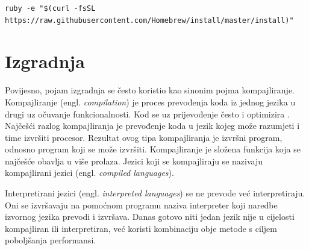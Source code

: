 \documentclass[times, utf8, diplomski, numeric]{fer}
\newcommand{\eng}[1]{(engl. \textit{#1})}
\begin{document}
\begin{lstlisting}[caption=Instalacija Homebrew alata, label=listing:homebrew]
ruby -e "$(curl -fsSL https://raw.githubusercontent.com/Homebrew/install/master/install)"
\end{lstlisting}

\section{Izgradnja} \label{header:Izgradnja}

Povijesno, pojam izgradnja se često koristio kao sinonim pojma kompajliranje. Kompajliranje \eng{compilation} je proces prevođenja koda iz jednog jezika u drugi uz očuvanje funkcionalnosti. Kod se uz prijevođenje često i optimizira . Najčešći razlog kompajliranja je prevođenje koda u jezik kojeg može razumjeti i time izvršiti procesor. Rezultat ovog tipa kompajliranja je izvršni program, odnosno program koji se može izvršiti. Kompajliranje je složena funkcija koja se najčešće obavlja u više prolaza. Jezici koji se kompajliraju se nazivaju kompajlirani jezici \eng{compiled languages}.

Interpretirani jezici \eng{interpreted languages} se ne prevode već interpretiraju. Oni se izvršavaju na pomoćnom programu naziva interpreter koji naredbe izvornog jezika prevodi i izvršava. Danas gotovo niti jedan jezik nije u cijelosti kompajliran ili interpretiran, već koristi kombinaciju obje metode s ciljem poboljšanja performansi.
\end{document}

